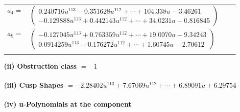 \documentclass[1p]{elsarticle_modified}
\theoremstyle{definition}
\begin{document}
\begin{tabular}{m{7pt} m{180pt} m{7pt} m{180pt} }
\flushright $a_{4}=$&$\begin{pmatrix}0.240716 u^{113}-0.351628 u^{112}+\cdots+104.338 u-3.46261\\-0.129888 u^{113}+0.442143 u^{112}+\cdots+34.0231 u-0.816845\end{pmatrix}$ \\
\flushright $a_{9}=$&$\begin{pmatrix}-0.127045 u^{113}+0.763359 u^{112}+\cdots+19.0070 u-9.34243\\0.0914259 u^{113}-0.176272 u^{112}+\cdots+1.60745 u-2.70612\end{pmatrix}$\\&\end{tabular}
\flushleft \textbf{(ii) Obstruction class $= -1$}\\~\\
\flushleft \textbf{(iii) Cusp Shapes $= -2.28402 u^{113}+7.67069 u^{112}+\cdots+6.89091 u+6.29754$}\\~\\
\newpage\renewcommand{\arraystretch}{1}
\flushleft \textbf{(iv) u-Polynomials at the component}\newline \\
\end{document}
